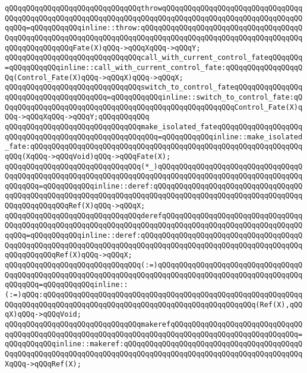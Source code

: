 \verb|qQQqqQQqqQQqqQQqqQQqqQQqqQQqqQQqthrowqQQqqQQqqQQqqQQqqQQqqQQqqQQqqQQqqQQqqQQqqQQqqQQqqQQqqQQqqQQqqQQqqQQqqQQqqQQqqQQqqQQqqQQqqQQqqQQqqQQqqQQqqQQq=qQQqqQQqqQQqinline::throw:qQQqqQQqqQQqqQQqqQQqqQQqqQQqqQQqqQQqqQQqqQQqqQQqqQQqqQQqqQQqqQQqqQQqqQQqqQQqqQQqqQQqqQQqqQQqqQQqqQQqqQQqqQQqqQQqqQQqqQQqqQQqFate(X)qQQq->qQQqXqQQq->qQQqY;|\newline
\newline
\verb|qQQqqQQqqQQqqQQqqQQqqQQqqQQqqQQqcall_with_current_control_fateqQQqqQQq=qQQqqQQqqQQqinline::call_with_current_control_fate:qQQqqQQqqQQqqQQqqQQq(Control_Fate(X)qQQq->qQQqX)qQQq->qQQqX;|\newline
\verb|qQQqqQQqqQQqqQQqqQQqqQQqqQQqqQQqswitch_to_control_fateqQQqqQQqqQQqqQQqqQQqqQQqqQQqqQQqqQQqqQQq=qQQqqQQqqQQqinline::switch_to_control_fate:qQQqqQQqqQQqqQQqqQQqqQQqqQQqqQQqqQQqqQQqqQQqqQQqqQQqqQQqControl_Fate(X)qQQq->qQQqXqQQq->qQQqY;qQQqqQQqqQQq|\newline
\verb|qQQqqQQqqQQqqQQqqQQqqQQqqQQqqQQqmake_isolated_fateqQQqqQQqqQQqqQQqqQQqqQQqqQQqqQQqqQQqqQQqqQQqqQQqqQQqqQQq=qQQqqQQqqQQqinline::make_isolated_fate:qQQqqQQqqQQqqQQqqQQqqQQqqQQqqQQqqQQqqQQqqQQqqQQqqQQqqQQqqQQqqQQqqQQq(XqQQq->qQQqVoid)qQQq->qQQqFate(X);|\newline
\newline
\verb|qQQqqQQqqQQqqQQqqQQqqQQqqQQqqQQq(*_)qQQqqQQqqQQqqQQqqQQqqQQqqQQqqQQqqQQqqQQqqQQqqQQqqQQqqQQqqQQqqQQqqQQqqQQqqQQqqQQqqQQqqQQqqQQqqQQqqQQqqQQqqQQqqQQq=qQQqqQQqqQQqinline::deref:qQQqqQQqqQQqqQQqqQQqqQQqqQQqqQQqqQQqqQQqqQQqqQQqqQQqqQQqqQQqqQQqqQQqqQQqqQQqqQQqqQQqqQQqqQQqqQQqqQQqqQQqqQQqqQQqqQQqqQQqRef(X)qQQq->qQQqX;|\newline
\verb|qQQqqQQqqQQqqQQqqQQqqQQqqQQqqQQqderefqQQqqQQqqQQqqQQqqQQqqQQqqQQqqQQqqQQqqQQqqQQqqQQqqQQqqQQqqQQqqQQqqQQqqQQqqQQqqQQqqQQqqQQqqQQqqQQqqQQqqQQqqQQq=qQQqqQQqqQQqinline::deref:qQQqqQQqqQQqqQQqqQQqqQQqqQQqqQQqqQQqqQQqqQQqqQQqqQQqqQQqqQQqqQQqqQQqqQQqqQQqqQQqqQQqqQQqqQQqqQQqqQQqqQQqqQQqqQQqqQQqqQQqRef(X)qQQq->qQQqX;|\newline
\verb|qQQqqQQqqQQqqQQqqQQqqQQqqQQqqQQq(:=)qQQqqQQqqQQqqQQqqQQqqQQqqQQqqQQqqQQqqQQqqQQqqQQqqQQqqQQqqQQqqQQqqQQqqQQqqQQqqQQqqQQqqQQqqQQqqQQqqQQqqQQqqQQqqQQq=qQQqqQQqqQQqinline::(:=)qQQq:qQQqqQQqqQQqqQQqqQQqqQQqqQQqqQQqqQQqqQQqqQQqqQQqqQQqqQQqqQQqqQQqqQQqqQQqqQQqqQQqqQQqqQQqqQQqqQQqqQQqqQQqqQQqqQQqqQQqqQQq(Ref(X),qQQqX)qQQq->qQQqVoid;|\newline
\verb|qQQqqQQqqQQqqQQqqQQqqQQqqQQqqQQqmakerefqQQqqQQqqQQqqQQqqQQqqQQqqQQqqQQqqQQqqQQqqQQqqQQqqQQqqQQqqQQqqQQqqQQqqQQqqQQqqQQqqQQqqQQqqQQqqQQqqQQq=qQQqqQQqqQQqinline::makeref:qQQqqQQqqQQqqQQqqQQqqQQqqQQqqQQqqQQqqQQqqQQqqQQqqQQqqQQqqQQqqQQqqQQqqQQqqQQqqQQqqQQqqQQqqQQqqQQqqQQqqQQqqQQqqQQqXqQQq->qQQqRef(X);|\newline
